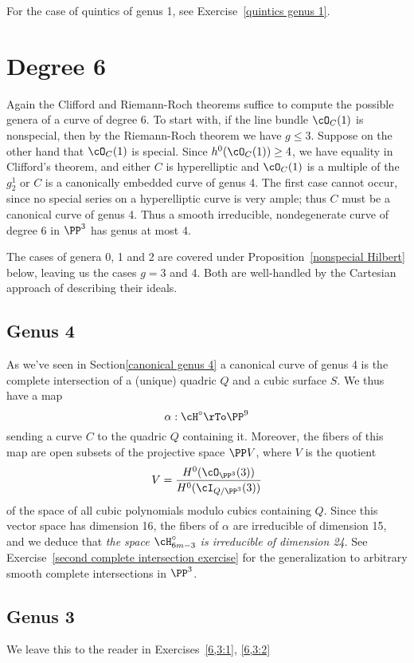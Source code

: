 For the case of quintics of genus 1, see Exercise~\ref{quintics genus 1}.

\section{Degree 6}

Again the Clifford and Riemann-Roch theorems suffice to compute the possible genera of a curve of degree 6. To start with,  if the line bundle $\cO_C(1)$ is nonspecial, then by the Riemann-Roch theorem we have $g \leq 3$. Suppose on the other hand that $\cO_C(1)$ is special. Since   $h^{0}(\cO_C(1)) \geq 4$, we have equality in Clifford's theorem, and either $C$ is hyperelliptic and $\cO_C(1)$ is a multiple of the $g^{1}_{2}$ or  $C$ is  a canonically embedded curve of genus 4. The first case cannot occur, since no special series on a hyperelliptic curve is very ample; thus $C$ must be a canonical curve of genus 4. Thus a smooth irreducible, nondegenerate curve of degree 6 in $\PP^3$ has genus at most 4.


The cases of genera 0, 1 and 2 are covered under Proposition~\ref{nonspecial Hilbert} below, leaving us the cases $g = 3$ and 4. Both are well-handled by the Cartesian approach of describing their ideals.

\subsection{Genus 4}

As we've seen in Section\ref{canonical genus 4} a canonical curve of genus 4 is the complete intersection of a (unique) quadric $Q$ and a cubic surface $S$. We thus have a map
$$
\alpha : \cH^\circ \rTo \PP^9
$$
sending a curve $C$ to the quadric $Q$ containing it. Moreover, the fibers of this map are open subsets of the projective space $\PP V$, where $V$ is the quotient
$$
V = \frac{H^0(\cO_{\PP^3}(3))}{H^0(\cI_{Q/\PP^3}(3))}
$$
of the space of all cubic polynomials modulo cubics containing $Q$. Since this vector space has dimension 16, the fibers of $\alpha$ are irreducible of dimension 15, and we deduce that \emph{the space $\cH^\circ_{6m-3}$ is irreducible of dimension 24}.
See Exercise~\ref{second complete intersection exercise} for the generalization to arbitrary smooth complete intersections in $\PP^3$.

\subsection{Genus 3}
We leave this to the reader in Exercises~\ref{6,3:1}, \ref{6,3:2}






